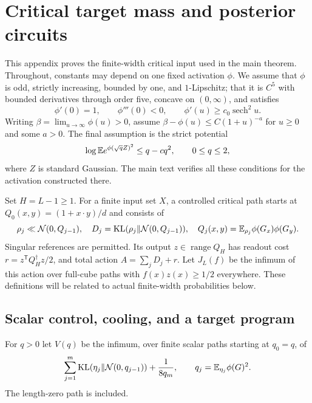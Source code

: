\section{Critical target mass and posterior circuits}
\label{ac-appendix}

This appendix proves the finite-width critical input used in the main
theorem. Throughout, constants may depend on one fixed activation $\phi$.
We assume that $\phi$ is odd, strictly increasing, bounded by one,
and $1$-Lipschitz; that it is $C^5$ with bounded derivatives through
order five, concave on $(0,\infty)$, and satisfies
\[
 \phi'(0)=1,\qquad \phi'''(0)<0,\qquad
 \phi'(u)\ge c_0\operatorname{sech}^2u.
\]
Writing $\beta=\lim_{u\to\infty}\phi(u)>0$, assume
$\beta-\phi(u)\le C(1+u)^{-a}$ for $u\ge0$ and some $a>0$.
The final assumption is the strict potential
\begin{equation}\label{ac-potential}
 \log\mathbb E e^{\phi(\sqrt q Z)^2}\le q-cq^2,
                  \qquad 0\le q\le2,
\end{equation}
where $Z$ is standard Gaussian. The main text verifies all these
conditions for the activation constructed there.

Set $H=L-1\ge1$. For a finite input set $X$, a controlled critical
path starts at $Q_0(x,y)=(1+x\cdot y)/d$ and consists of
\[
 \rho_j\ll\mathcal N(0,Q_{j-1}),\quad
 D_j=\operatorname{KL}(\rho_j\Vert\mathcal N(0,Q_{j-1})),\quad
 Q_j(x,y)=\mathbb E_{\rho_j}\phi(G_x)\phi(G_y).
\]
Singular references are permitted. Its output $z\in\operatorname{range}Q_H$
has readout cost $r=z^{\mathsf T}Q_H^\dagger z/2$, and total action
$A=\sum_jD_j+r$. Let $J_L(f)$ be the infimum of this action over
full-cube paths with $f(x)z(x)\ge1/2$ everywhere. These definitions
will be related to actual finite-width probabilities below.

\subsection{Scalar control, cooling, and a target program}

For $q>0$ let $V(q)$ be the infimum, over finite scalar paths starting
at $q_0=q$, of
\[
 \sum_{j=1}^m\operatorname{KL}(\eta_j\Vert\mathcal N(0,q_{j-1}))
       +\frac1{8q_m},\qquad q_j=\mathbb E_{\eta_j}\phi(G)^2.
\]
The length-zero path is included.

